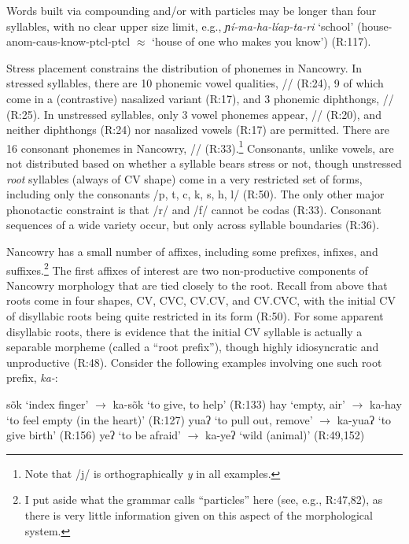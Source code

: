 \documentclass[output=paper,colorlinks,citecolor=brown,
]{langscibook}
\begin{document}
\noindent Words built via compounding and/or with particles may be longer than four syllables, with no clear upper size limit, e.g., {\it ɲ\'i-ma-ha-l\'iap-ta-ri} `school' (house-{\sc anom-caus-}know-{\sc ptcl-ptcl}  $\approx$ `house of one who makes you know') (R:117).

Stress placement constrains the distribution of phonemes in Nancowry. In stressed syllables, there are 10 phonemic vowel qualities, // (R:24), 9 of which come in a (contrastive) nasalized variant (R:17), and 3 phonemic diphthongs, // (R:25). In unstressed syllables, only 3 vowel phonemes appear, // (R:20), and neither diphthongs (R:24) nor nasalized vowels (R:17) are permitted. There are 16 consonant phonemes in Nancowry, // (R:33).\footnote{Note that /j/ is orthographically \textit{y} in all examples.} Consonants, unlike vowels, are not distributed based on whether a syllable bears stress or not, though unstressed {\it root} syllables (always of CV shape) come in a very restricted set of forms, including only the consonants /p, t, c, k, s, h, l/ (R:50). The only other major phonotactic constraint is that /r/ and /f/ cannot be codas (R:33). Consonant sequences of a wide variety occur, but only across syllable boundaries (R:36).

Nancowry has a small number of affixes, including some prefixes, infixes, and suffixes.\footnote{I put aside what the grammar calls ``particles'' here (see, e.g., R:47,82), as there is very little information given on this aspect of the morphological system.} The first affixes of interest are two non-productive components of Nancowry morphology that are tied closely to the root. Recall from above that roots come in four shapes, CV, CVC, CV.CV, and CV.CVC, with the initial CV of disyllabic roots being quite restricted in its form (R:50). For some apparent disyllabic roots, there is evidence that the initial CV syllable is actually a separable morpheme (called a ``root prefix''), though highly idiosyncratic and unproductive (R:48). Consider the following examples involving one such root prefix, \textit{ka-}:

\ea\label{kalinrps}  
\ea s\~ok `index finger' $\rightarrow$ {ka}-s\~ok `to give, to help' \hfill (R:133)
\ex hay `empty, air' $\rightarrow$ {ka}-hay `to feel empty (in the heart)' \hfill (R:127)
\ex yuaʔ `to pull out, remove' $\rightarrow$ {ka}-yuaʔ `to give birth' \hfill (R:156)
\ex yeʔ `to be afraid' $\rightarrow$ {ka}-yeʔ `wild (animal)' \hfill (R:49,152)\label{kalinafraid}
\z
\z
\end{document}
